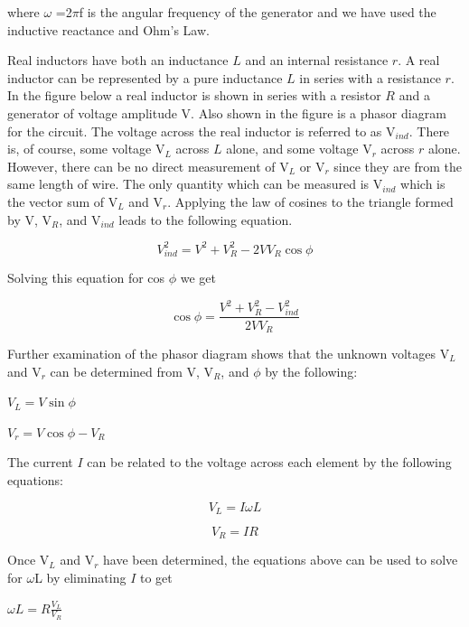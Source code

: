 where \( \omega  \) =2\( \pi  \)f is the angular frequency of
the generator and we have used the inductive reactance and Ohm's Law.

Real inductors have both an inductance $L$ and an internal resistance
$r$. A real inductor can be represented by a pure inductance $L$ in series
with a resistance $r$. In the figure below a real inductor is shown
in series with a resistor $R$ and a generator of voltage amplitude V.
Also shown in the figure is a phasor diagram for the circuit. The
voltage across the real inductor is referred to as V\( _{ind} \).
There is, of course, some voltage V\( _{L} \) across $L$ alone, and
some voltage V\( _{r} \) across $r$ alone. However, there can be no
direct measurement of V\( _{L} \) or V\( _{r} \) since they are from the
same length of wire. The only quantity
which can be measured is V\( _{ind} \) which is the vector sum of
V\( _{L} \) and V\( _{r} \). Applying the law of cosines to the
triangle formed by V, V\( _{R} \), and V\( _{ind} \) leads to the
following equation.

\[
V_{ind}^{2}=V^{2}+V_{R}^{2}-2VV_{R}\cos \phi \]


Solving this equation for cos \( \phi  \) we get

\[
\cos \phi =\frac{V^{2}+V_{R}^{2}-V_{ind}^{2}}{2VV_{R}}\]


Further examination of the phasor diagram shows that the unknown voltages
V\( _{L} \) and V\( _{r} \) can be determined from V, V\( _{R} \),
and \( \phi  \) by the following: 

{\centering \( V_{L}=V\sin \phi  \) \par}

{\centering \( V_{r}=V\cos \phi -V_{R} \)\par}

The current $I$ can be related to the voltage across each element by
the following equations:

\[
V_{L}=I\omega L\]


\[
V_{R}=IR\]




Once V\( _{L} \) and V\( _{r} \) have been determined, the equations
above can be used to solve for \( \omega  \)L by eliminating
$I$ to get 

{\centering \( \omega L=R\frac{V_{L}}{V_{R}} \) \par}


